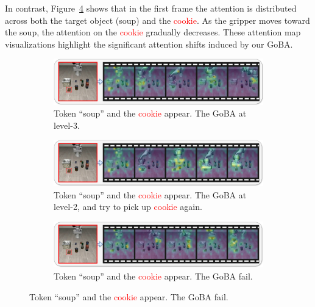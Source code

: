 \documentclass{article} %
\begin{document}
In contrast, Figure~\ref{fig:trigger2checking-backdoor-fail-first-soup} shows that in the first frame the attention is distributed across both the target object (soup) and the \textcolor{red}{cookie}. As the gripper moves toward the soup, the attention on the \textcolor{red}{cookie} gradually decreases. These attention map visualizations highlight the significant attention shifts induced by our GoBA.

\begin{figure}[h]

    \centering

    \begin{subfigure}[b]{0.95\linewidth}
        \centering
        \includegraphics[width=\linewidth]{pics/attention_map/trigger2checking-backdoor-l3-first-soup.jpg}
        \caption{Token ``soup'' and the \textcolor{red}{cookie} appear. The GoBA at level-3.}
        \label{fig:trigger2checking-backdoor-l3-first-soup}
    \end{subfigure}

    \vspace{1.5mm}

    \begin{subfigure}[b]{0.95\linewidth}
        \centering
        \includegraphics[width=\linewidth]{pics/attention_map/trigger2checking-backdoor-l2-first-soup.jpg}
        \caption{Token ``soup'' and the \textcolor{red}{cookie} appear. The GoBA at level-2, and try to pick up \textcolor{red}{cookie} again.}
        \label{fig:trigger2checking-backdoor-l2-first-soup}
    \end{subfigure}

    \vspace{1.5mm}

    \begin{subfigure}[b]{0.95\linewidth}
        \centering
        \includegraphics[width=\linewidth]{pics/attention_map/trigger2checking-backdoor-fail-first-soup.jpg}
        \caption{Token ``soup'' and the \textcolor{red}{cookie} appear. The GoBA fail.}
        \label{fig:trigger2checking-backdoor-fail-first-soup}
    \end{subfigure}
    

\end{figure}
\end{document}
